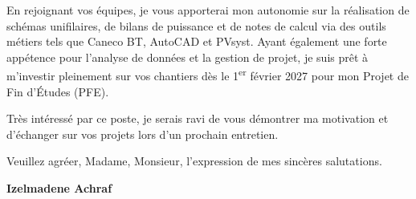 \documentclass[10pt,a4paper]{altacv}
\begin{document}
En rejoignant vos équipes, je vous apporterai mon autonomie sur la réalisation de schémas unifilaires, de bilans de puissance et de notes de calcul via des outils métiers tels que Caneco BT, AutoCAD et PVsyst. Ayant également une forte appétence pour l'analyse de données et la gestion de projet, je suis prêt à m'investir pleinement sur vos chantiers dès le 1\textsuperscript{er} février 2027 pour mon Projet de Fin d'Études (PFE).

\vspace{0.4cm}

Très intéressé par ce poste, je serais ravi de vous démontrer ma motivation et d'échanger sur vos projets lors d'un prochain entretien.

\vspace{0.5cm}

Veuillez agréer, Madame, Monsieur, l'expression de mes sincères salutations.

\vfill

\begin{flushright}
  \Large\color{emphasis}\textbf{Izelmadene Achraf}
\end{flushright}
\end{document}
